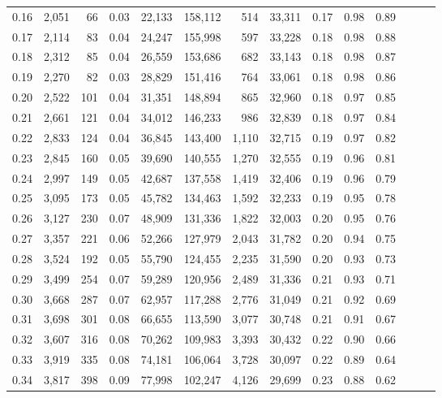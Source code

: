 \begin{tabular}{rrrrrrrrrrrrrr}
0.16 &  2,051 &   66 &  0.03 &   22,133 &  158,112 &     514 &  33,311 &  0.17 &  0.98 &      0.89 \\
0.17 &  2,114 &   83 &  0.04 &   24,247 &  155,998 &     597 &  33,228 &  0.18 &  0.98 &      0.88 \\
0.18 &  2,312 &   85 &  0.04 &   26,559 &  153,686 &     682 &  33,143 &  0.18 &  0.98 &      0.87 \\
0.19 &  2,270 &   82 &  0.03 &   28,829 &  151,416 &     764 &  33,061 &  0.18 &  0.98 &      0.86 \\
0.20 &  2,522 &  101 &  0.04 &   31,351 &  148,894 &     865 &  32,960 &  0.18 &  0.97 &      0.85 \\
0.21 &  2,661 &  121 &  0.04 &   34,012 &  146,233 &     986 &  32,839 &  0.18 &  0.97 &      0.84 \\
0.22 &  2,833 &  124 &  0.04 &   36,845 &  143,400 &   1,110 &  32,715 &  0.19 &  0.97 &      0.82 \\
0.23 &  2,845 &  160 &  0.05 &   39,690 &  140,555 &   1,270 &  32,555 &  0.19 &  0.96 &      0.81 \\
0.24 &  2,997 &  149 &  0.05 &   42,687 &  137,558 &   1,419 &  32,406 &  0.19 &  0.96 &      0.79 \\
0.25 &  3,095 &  173 &  0.05 &   45,782 &  134,463 &   1,592 &  32,233 &  0.19 &  0.95 &      0.78 \\
0.26 &  3,127 &  230 &  0.07 &   48,909 &  131,336 &   1,822 &  32,003 &  0.20 &  0.95 &      0.76 \\
0.27 &  3,357 &  221 &  0.06 &   52,266 &  127,979 &   2,043 &  31,782 &  0.20 &  0.94 &      0.75 \\
0.28 &  3,524 &  192 &  0.05 &   55,790 &  124,455 &   2,235 &  31,590 &  0.20 &  0.93 &      0.73 \\
0.29 &  3,499 &  254 &  0.07 &   59,289 &  120,956 &   2,489 &  31,336 &  0.21 &  0.93 &      0.71 \\
0.30 &  3,668 &  287 &  0.07 &   62,957 &  117,288 &   2,776 &  31,049 &  0.21 &  0.92 &      0.69 \\
0.31 &  3,698 &  301 &  0.08 &   66,655 &  113,590 &   3,077 &  30,748 &  0.21 &  0.91 &      0.67 \\
0.32 &  3,607 &  316 &  0.08 &   70,262 &  109,983 &   3,393 &  30,432 &  0.22 &  0.90 &      0.66 \\
0.33 &  3,919 &  335 &  0.08 &   74,181 &  106,064 &   3,728 &  30,097 &  0.22 &  0.89 &      0.64 \\
0.34 &  3,817 &  398 &  0.09 &   77,998 &  102,247 &   4,126 &  29,699 &  0.23 &  0.88 &      0.62 \\

\end{tabular}
